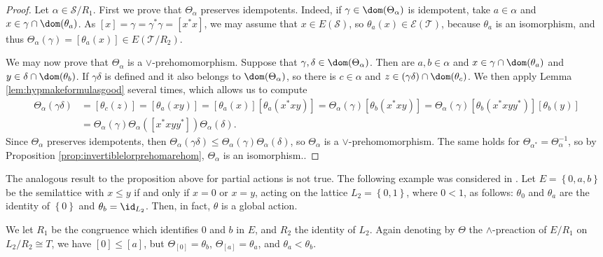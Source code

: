 \begin{proof}
    Let $\alpha\in\mathcal{S}/R_1$. First we prove that $\Theta_\alpha$ preserves idempotents. Indeed, if $\gamma\in\dom(\Theta_\alpha)$ is idempotent, take $a\in\alpha$ and $x\in\gamma\cap\dom(\theta_a)$. As $[x]=\gamma=\gamma^*\gamma=[x^*x]$, we may assume that $x\in E(\mathcal{S})$, so $\theta_a(x)\in\mathcal{E}(\mathcal{T})$, because $\theta_a$ is an isomorphism, and thus $\Theta_\alpha(\gamma)=[\theta_a(x)]\in E(\mathcal{T}/R_2)$.
    
    We may now prove that $\Theta_{\alpha}$ is a $\lor$-prehomomorphism. Suppose that $\gamma,\delta\in\dom(\Theta_\alpha)$. Then are $a,b\in\alpha$ and $x\in\gamma\cap\dom(\theta_a)$ and $y\in\delta\cap\dom(\theta_b)$. If $\gamma\delta$ is defined and it also belongs to $\dom(\Theta_\alpha)$, so there is $c\in\alpha$ and $z\in(\gamma\delta)\cap\dom(\theta_c)$. We then apply Lemma \ref{lem:hypmakeformulasgood} several times, which allows us to compute
    \begin{align*}
        \Theta_\alpha(\gamma\delta)&=[\theta_c(z)]=[\theta_a(xy)]=[\theta_a(x)][\theta_a(x^*xy)]=\Theta_\alpha(\gamma)[\theta_b(x^*xy)]=\Theta_\alpha(\gamma)[\theta_b(x^*xyy^*)][\theta_b(y)]\\
        &=\Theta_\alpha(\gamma)\Theta_\alpha([x^*xyy^*])\Theta_\alpha(\delta).
    \end{align*}
    Since $\Theta_\alpha$ preserves idempotents, then $\Theta_\alpha(\gamma\delta)\leq\Theta_\alpha(\gamma)\Theta_\alpha(\delta)$, so $\Theta_\alpha$ is a $\lor$-prehomomorphism. The same holds for $\Theta_{\alpha^*}=\Theta_\alpha^{-1}$, so by Proposition \ref{prop:invertiblelorprehomarehom}, $\Theta_\alpha$ is an isomorphism.\qedhere.
\end{proof}

\begin{remark}
    The analogous result to the proposition above for partial actions is not true. The following example was considered in \cite[Example 4.5]{Mikola2017}. Let $E=\left\{0,a,b\right\}$ be the semilattice with $x\leq y$ if and only if $x=0$ or $x=y$, acting on the lattice $L_2=\left\{0,1\right\}$, where $0<1$, as follows: $\theta_0$ and $\theta_a$ are the identity of $\left\{0\right\}$ and $\theta_b=\id_{L_2}$. Then, in fact, $\theta$ is a global action.
    
    We let $R_1$ be the congruence which identifies $0$ and $b$ in $E$, and $R_2$ the identity of $L_2$. Again denoting by $\Theta$ the $\land$-preaction of $E/R_1$ on $L_2/R_2\cong T$, we have $[0]\leq[a]$, but $\Theta_{[0]}=\theta_b$, $\Theta_{[a]}=\theta_a$, and $\theta_a<\theta_b$.
\end{remark}

